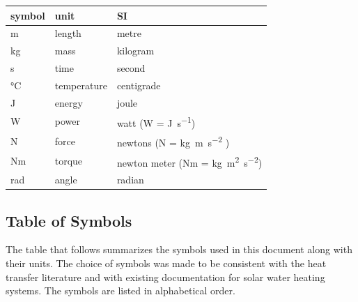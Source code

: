 \documentclass[12pt]{article}
\begin{document}
\renewcommand{\arraystretch}{1.2}
  \noindent \begin{tabular}{l l l} 
    \toprule		
    \textbf{symbol} & \textbf{unit} & \textbf{SI}\\
    \midrule 
    \si{\metre} & length & metre\\
    \si{\kilogram} & mass	& kilogram\\
    \si{\second} & time & second\\
    \si{\celsius} & temperature & centigrade\\
    \si{\joule} & energy & joule\\
    \si{\watt} & power & watt (W = \si{\joule\per\second})\\
    \si{\newton} & force & newtons (N = \si{\kilogram \metre\per\square\second} )\\
    Nm & torque & newton meter (Nm = \si{\kilogram \square\metre\per\square\second})\\
    \si{\radian} & angle & radian\\
    \bottomrule
  \end{tabular}

\subsection{Table of Symbols}

The table that follows summarizes the symbols used in this document along with
their units.  The choice of symbols was made to be consistent with the heat
transfer literature and with existing documentation for solar water heating
systems.  The symbols are listed in alphabetical order.
\end{document}
